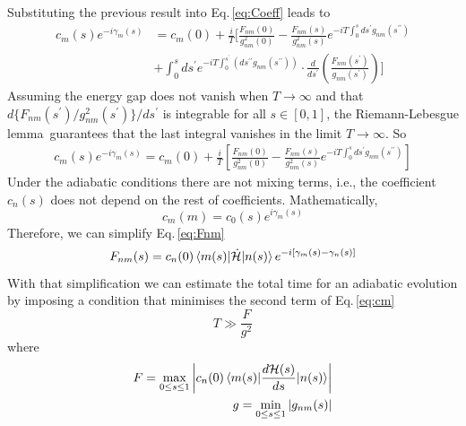  Substituting the previous result into Eq.\,\eqref{eq:Coeff} leads to
 \begin{equation}
 \begin{split}
      c_{m}(s)e^{-i\gamma_{m}(s)} & = c_{m}(0) + \frac{i}{T}\Biggr[\frac{F_{nm}(0)}{g^{2}_{nm}(0)} - \frac{F_{nm}(s)}{g^{2}_{nm}(s)}e^{-iT\int_{0}^{s}ds^{\prime}g_{nm}(s^{\prime \prime})} \\
      & + \int_{0}^{s}ds^{\prime} e^{-iT\int_{0}^{s^{\prime}}\left(ds^{\prime \prime}g_{nm}(s^{\prime\prime}) \right)} \cdot \frac{d}{ds^{\prime}}\left(\frac{F_{nm}(s^{\prime})}{g_{nm}(s^{\prime})}\right)\Biggr]
\end{split}
\end{equation}
 Assuming the energy gap does not vanish when $T \rightarrow \infty$ and that $d\{F_{nm}(s^{\prime})/g_{nm}^{2}(s^{\prime})\}/ds^{\prime}$ is integrable for all $s \in [0,1]$, the Riemann-Lebesgue lemma\,\cite{BrownChurchill} guarantees that the last integral vanishes in the limit $T \rightarrow \infty$. So
  \begin{align}
  \label{eq:cm}
     c_{m}(s)e^{-i\gamma_{m}(s)} = c_{m}(0) + \frac{i}{T}\left[\frac{F_{nm}(0)}{g^{2}_{nm}(0)} - \frac{F_{nm}(s)}{g^{2}_{nm}(s)}e^{-iT\int_{0}^{s}ds^{\prime}g_{nm}(s^{\prime \prime})}\right] 
 \end{align}
 Under the adiabatic conditions there are not mixing terms, i.e., the coefficient $c_{n}(s)$ does not depend on the rest of coefficients. Mathematically,
\begin{equation}
    c_{m}(m) = c_{0}(s)e^{i\gamma_{m}(s)}
\end{equation}
Therefore, we can simplify Eq.\,\eqref{eq:Fnm}
\begin{equation}
    F_{nm}(s) = c_{n}(0)\braket{m(s)|\dot{\mathcal{H}}|n(s)} e^{-i\left[\gamma_{m}(s) - \gamma_{n}(s)\right]}
\end{equation}
 With that simplification we can estimate the total time for an adiabatic evolution by imposing a condition that minimises the second term of Eq.\,\eqref{eq:cm}
 \begin{equation}
     T \gg \frac{F}{g^{2}}
 \end{equation}
 where
 \begin{align}
     F = \max_{0 \leq s \leq 1} \left|c_{n}(0)\braket{m(s)|\frac{d\mathcal{H}(s)}{ds}| n(s)}\right| \\
     g = \min_{0 \leq s \leq 1} |g_{nm}(s)|
 \end{align}
